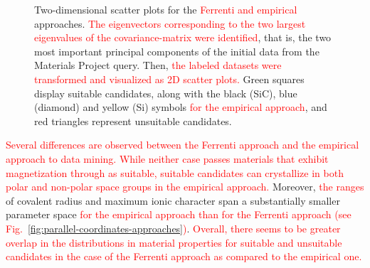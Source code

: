\documentclass[superscriptaddress,unsortedaddress,
 amsmath,amssymb,
 aps,
]{revtex4-2}
\newcommand{\mrk}[1]{\textcolor{red}{#1}}
\begin{document}
\begin{figure}
\begin{subfigure}{0.35\textwidth}
    \end{subfigure}
    \caption{Two-dimensional scatter plots for the \mrk{Ferrenti and empirical} approaches. \mrk{The eigenvectors corresponding to the two largest eigenvalues of the covariance-matrix were identified}, that is, the two most important principal components of the initial data from the Materials Project query. Then, \mrk{the labeled datasets were transformed and visualized as 2D scatter plots.} Green squares display suitable candidates, along with the black (SiC), blue (diamond) and yellow (Si) symbols \mrk{for the empirical approach}, and red triangles represent unsuitable candidates.}
    \label{fig:2dscatterplotpca}
\end{figure}


\mrk{Several differences are observed between the Ferrenti approach and the empirical approach to data mining. While neither case passes materials that exhibit magnetization through as suitable, suitable candidates can crystallize in both polar and non-polar space groups in the empirical approach.} Moreover, \mrk{the ranges}  of covalent radius and maximum ionic character span a substantially smaller parameter space \mrk{for the empirical approach than for the Ferrenti approach (see Fig.~\ref{fig:parallel-coordinates-approaches})}.
\mrk{Overall, there seems to be greater overlap in the distributions in material properties for suitable and unsuitable candidates in the case of the Ferrenti approach as compared to the empirical one.} 
\end{document}
